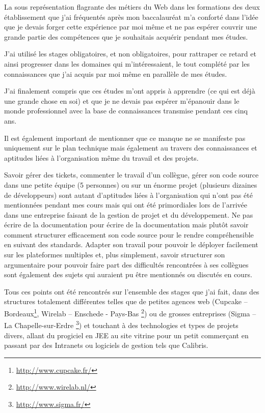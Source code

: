 \documentclass[12pt,a4paper]{book}
\begin{document}
La sous représentation flagrante des métiers du Web dans les formations des deux établissement que j'ai fréquentés après mon baccalauréat m'a conforté dans l'idée que je devais forger cette expérience par moi même et ne pas espérer couvrir une grande partie des compétences que je souhaitais acquérir pendant mes études.

J'ai utilisé les stages obligatoires, et non obligatoires, pour rattraper ce retard et ainsi progresser dans les domaines qui m'intéressaient, le tout complété par les connaissances que j'ai acquis par moi même en parallèle de mes études.

J'ai finalement compris que ces études m'ont appris à apprendre (ce qui est déjà une grande chose en soi) et que je ne devais pas espérer m'épanouir dans le monde professionnel avec la base de connaissances transmise pendant ces cinq ans.

Il est également important de mentionner que ce manque ne se manifeste pas uniquement sur le plan technique mais également au travers des connaissances et aptitudes liées à l'organisation même du travail et des projets. 

Savoir gérer des tickets, commenter le travail d'un collègue, gérer son code source dans une petite équipe (5 personnes) ou sur un énorme projet (plusieurs dizaines de développeurs) sont autant d'aptitudes liées à l'organisation qui n'ont pas été mentionnées pendant mes cours mais qui ont été primordiales lors de l'arrivée dans une entreprise faisant de la gestion de projet et du développement.
Ne pas écrire de la documentation pour écrire de la documentation mais plutôt savoir comment structurer efficacement son code source pour le rendre compréhensible en suivant des standards. Adapter son travail pour pouvoir le déployer facilement sur les plateformes multiples et, plus simplement, savoir structurer son argumentaire pour pouvoir faire part des difficultés rencontrées à ses collègues sont également des sujets qui auraient pu être mentionnés ou discutés en cours. 

Tous ces points ont été rencontrés sur l'ensemble des stages que j'ai fait, dans des structures totalement différentes telles que de petites agences web (Cupcake -- Bordeaux\footnote{\url{http://www.cupcake.fr/}}, Wirelab -- Enschede - Pays-Bas \footnote{\url{http://www.wirelab.nl/}}) ou de grosses entreprises (Sigma -- La Chapelle-sur-Erdre \footnote{\url{http://www.sigma.fr/}}) et touchant à des technologies et types de projets divers, allant du progiciel en JEE au site vitrine pour un petit commerçant en passant par des Intranets ou logiciels de gestion tels que Calibris.
\end{document}
